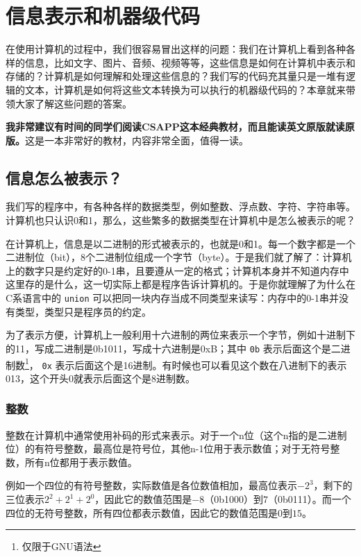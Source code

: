 \chapter{信息表示和机器级代码}\label{chap:ics-1}

在使用计算机的过程中，我们很容易冒出这样的问题：我们在计算机上看到各种各样的信息，比如文字、图片、音频、视频等等，这些信息是如何在计算机中表示和存储的？计算机是如何理解和处理这些信息的？我们写的代码充其量只是一堆有逻辑的文本，计算机是如何将这些文本转换为可以执行的机器级代码的？本章就来带领大家了解这些问题的答案。

\textbf{我非常建议有时间的同学们阅读CSAPP这本经典教材，而且能读英文原版就读原版。}这是一本非常好的教材，内容非常全面，值得一读。

\section{信息怎么被表示？}

我们写的程序中，有各种各样的数据类型，例如整数、浮点数、字符、字符串等。计算机也只认识0和1，那么，这些繁多的数据类型在计算机中是怎么被表示的呢？

在计算机上，信息是以二进制的形式被表示的，也就是0和1。每一个数字都是一个二进制位（bit），8个二进制位组成一个字节（byte）。于是我们就了解了：计算机上的数字只是约定好的0-1串，且要遵从一定的格式；计算机本身并不知道内存中这里存的是什么，这一切实际上都是程序告诉计算机的。于是你就理解了为什么在C系语言中的 \texttt{union} 可以把同一块内存当成不同类型来读写：内存中的0-1串并没有类型，类型只是程序员的约定。

为了表示方便，计算机上一般利用十六进制的两位来表示一个字节，例如十进制下的11，写成二进制是0b1011，写成十六进制是0xB；其中 \texttt{0b} 表示后面这个是二进制数\footnote{仅限于GNU语法}， \texttt{0x} 表示后面这个是16进制。有时候也可以看见这个数在八进制下的表示013，这个开头0就表示后面这个是8进制数。

\subsection{整数}
整数在计算机中通常使用补码的形式来表示。对于一个n位（这个n指的是二进制位）的有符号整数，最高位是符号位，其他n-1位用于表示数值；对于无符号整数，所有n位都用于表示数值。

例如一个四位的有符号整数，实际数值是各位数值相加，最高位表示$-2^3$，剩下的三位表示$2^2 + 2^1 + 2^0$，因此它的数值范围是$-8$（0b1000）到$7$（0b0111）。而一个四位的无符号整数，所有四位都表示数值，因此它的数值范围是$0$到$15$。


